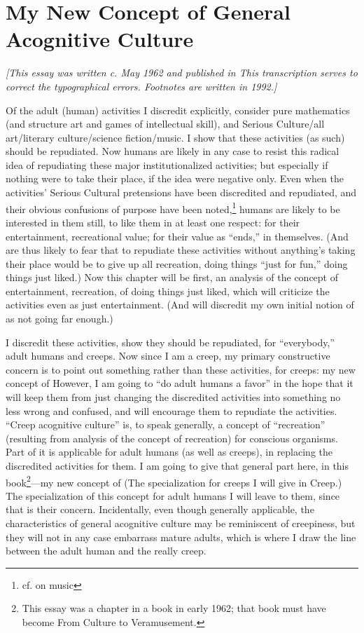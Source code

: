 \chapter{My New Concept of General Acognitive Culture}

{\itshape [This essay was written c. May 1962 and published in  This transcription serves to correct the typographical errors. Footnotes are written in 1992.]}

Of the adult (human) activities I discredit explicitly, consider pure mathematics (and structure art and games of intellectual skill), and Serious Culture\slash all art\slash literary culture\slash science fiction\slash music. I show that these activities (as such) should be repudiated. Now humans are likely in any case to resist this radical idea of repudiating these major institutionalized activities; but especially if nothing were to take their place, if the idea were negative only. Even when the activities' Serious Cultural pretensions have been discredited and repudiated, and their obvious confusions of purpose have been noted,\footnote{cf.  on music} humans are likely to be interested in them still, to like them in at least one respect: for their entertainment, recreational value; for their value as \enquote{ends,} in themselves. (And are thus likely to fear that to repudiate these activities without anything's taking their place would be to give up all recreation, doing things \enquote{just for fun,} doing things just liked.) Now this chapter will be first, an analysis of the concept of entertainment, recreation, of doing things just liked, which will criticize the activities even as just entertainment. (And will discredit my own initial notion of  as not going far enough.)

I discredit these activities, show they should be repudiated, for \enquote{everybody,} adult humans and creeps. Now since I am a creep, my primary constructive concern is to point out something rather than these activities, for creeps: my new concept of  However, I am going to \enquote{do adult humans a favor} in the hope that it will keep them from just changing the discredited activities into something no less wrong and confused, and will encourage them to repudiate the activities. \enquote{Creep acognitive culture} is, to speak generally, a concept of \enquote{recreation} (resulting from analysis of the concept of recreation) for conscious organisms. Part of it is applicable for adult humans (as well as creeps), in replacing the discredited activities for them. I am going to give that general part here, in this book\footnote{This essay was a chapter in a book in early 1962; that book must have become From Culture to Veramusement.}---my new concept of  (The specialization for creeps I will give in Creep.) The specialization of this concept for adult humans I will leave to them, since that is their concern. Incidentally, even though generally applicable, the characteristics of general acognitive culture may be reminiscent of creepiness, but they will not in any case embarrass mature adults, which is where I draw the line between the adult human and the really creep.

